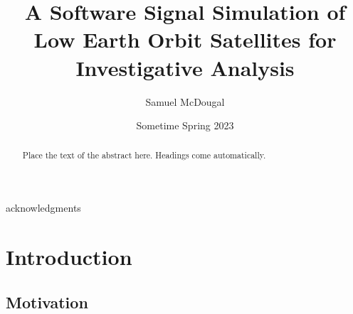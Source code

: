 \documentclass[12pt]{report}
\title{A Software Signal Simulation of Low Earth Orbit Satellites for Investigative Analysis}
\author{Samuel McDougal}
\date{Sometime Spring 2023} %
\begin{document}
\begin{romanpages}      %

\TitlePage 

\begin{abstract} 
Place the text of the abstract here. Headings come automatically.
\end{abstract}

\begin{acknowledgments}
acknowledgments
\end{acknowledgments}

\begin{singlespace}

\begin{center} 
\renewcommand{\cftchapfont}{}
\renewcommand{\cftchappagefont}{}
\renewcommand{\cfttoctitlefont}{\normalsize}%
\renewcommand{\cftsecfont }{\normalsize}%
\renewcommand{\cftsecpagefont}{\normalsize}%
\tableofcontents 
\newpage
\renewcommand{\cftchapfont}{}
\renewcommand{\cftchappagefont}{}
\renewcommand{\cftloftitlefont}{\normalsize}%
\renewcommand{\cftsecfont}{\normalsize}%
\renewcommand{\cftsecpagefont}{\normalsize}%
\listoffigures
\newpage
\renewcommand{\cftchapfont}{}
\renewcommand{\cftchappagefont}{}
\renewcommand{\cftlottitlefont}{\normalsize}%
\renewcommand{\cftsecfont}{\normalsize}%
\renewcommand{\cftsecpagefont}{\normalsize}%
\listoftables
\end{center}
\end{singlespace}

\printnomenclature[0.5in] %
\end{romanpages}        %


\normalem       %

 \chapter { Introduction}  %

\section { \normalfont Motivation}
\end{document}
